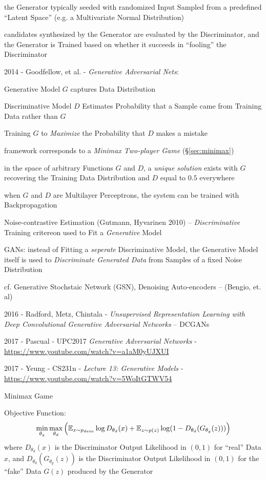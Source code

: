 the Generator typically seeded with randomized Input Sampled from a predefined
``Latent Space'' (e.g. a Multivariate Normal Distribution)

candidates synthesized by the Generator are evaluated by the Discriminator, and
the Generator is Trained based on whether it succeeds in ``fooling'' the
Discriminator

2014 - Goodfellow, et al. - \emph{Generative Adversarial Nets}:

Generative Model $G$ captures Data Distribution

Discriminative Model $D$ Estimates Probability that a Sample came from Training
Data rather than $G$

Training $G$ to \emph{Maximize} the Probability that $D$ makes a mistake

framework corresponds to a \emph{Minimax Two-player Game} (\S\ref{sec:minimax})

in the space of arbitrary Functions $G$ and $D$, a \emph{unique solution} exists
with $G$ recovering the Training Data Distribution and $D$ equal to $0.5$
everywhere

when $G$ and $D$ are Multilayer Perceptrons, the system can be trained with
Backpropagation

Noise-contrastive Estimation (Gutmann, Hyvarinen 2010) --
\emph{Discriminative} Training critereon used to Fit a \emph{Generative} Model

GANs: instead of Fitting a \emph{seperate} Discriminative Model, the Generative
Model itself is used to \emph{Discriminate Generated Data} from Samples of a
fixed Noise Distribution

cf. Generative Stochstaic Network (GSN), Denoising Auto-encoders --
(Bengio, et. al)

2016 - Radford, Metz, Chintala - \emph{Unsupervised Representation Learning with
  Deep Convolutional Generative Adversarial Networks} -- DCGANs

\asterism

2017 - Pascual - UPC2017 \emph{Generative Adversarial Networks} -
\url{https://www.youtube.com/watch?v=a1aM0yUJXUI}

2017 - Yeung - CS231n - \emph{Lecture 13: Generative Models} -
\url{https://www.youtube.com/watch?v=5WoItGTWV54}

Minimax Game

Objective Function:
\[
  \min_{\theta_g} \max_{\theta_d} \Big(
    \mathbb{E}_{x \sim p_{data}} \log D_{\theta_d}(x) +
    \mathbb{E}_{z \sim p(z)} \log (1 - D_{\theta_d}(G_{\theta_g}(z)))
  \Big)
\]
where $D_{\theta_d}(x)$ is the Discriminator Output Likelihood in $(0, 1)$ for
``real'' Data $x$, and $D_{\theta_d}(G_{\theta_g}(z))$ is the Discriminator
Output Likelihood in $(0, 1)$ for the ``fake'' Data $G(z)$ produced by the
Generator

